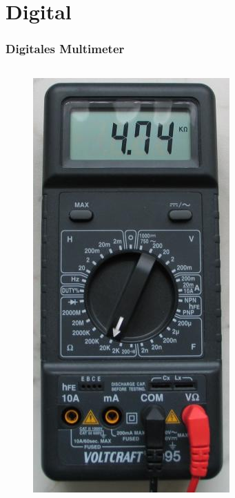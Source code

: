 \section*{Digital}

\begin{frame}
  \frametitle{Digitales Multimeter}
  \begin{columns}
    \begin{center}
      \begin{figure}
        \includegraphics[width=\textwidth,height=.7\textheight,keepaspectratio]{a16/digitalmultimeter.jpg}

\end{figure}
\end{center}
\end{columns}
\end{frame}
